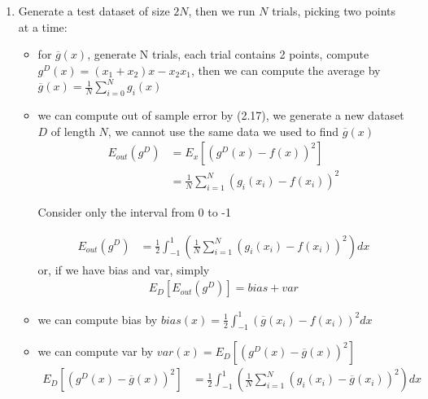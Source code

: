 \documentclass{article}
\begin{document}
\begin{enumerate}
\begin{enumerate}[label=(\alph*)]
            \item Generate a test dataset of size $2N$, then we run $N$ trials, picking two points at a time:
            \begin{itemize}
                \item for $\overline{g}(x)$, generate N trials, each trial contains 2 points, compute $g^D(x) = (x_1 + x_2)x - x_2x_1$, then we can compute the average by $\overline{g}(x) = \frac{1}{N}\sum_{i = 0}^{N}g_i(x)$
                \item we can compute out of sample error by (2.17), we generate a new dataset $D$ of length $N$, we cannot use the same data we used to find $\overline{g}(x)$
                \begin{align*}
                    E_{out}(g^D) &= E_x[(g^D(x) - f(x))^2]\\
                    &= \frac{1}{N}\sum_{i = 1}^{N}(g_i(x_i) - f(x_i))^2
                \end{align*}
                \begin{center}
                    Consider only the interval from 0 to -1
                \end{center}
                \begin{align*}
                    E_{out}(g^D) &= \frac{1}{2}\int_{-1}^{1}(\frac{1}{N}\sum_{i=1}^{N}(g_i(x_i) - f(x_i))^2)dx
                \end{align*}
                or, if we have bias and var, simply
                \begin{align*}
                    E_D[E_{out}(g^D)] = bias + var
                \end{align*}
                \item we can compute bias by $bias(x) = \frac{1}{2}\int_{-1}^{1}(\overline{g}(x_i) - f(x_i))^2dx$
                \item we can compute var by $var(x) = E_D[(g^D(x) - \overline{g}(x))^2]$
                \begin{align*}
                    E_D[(g^D(x) - \overline{g}(x))^2] &= \frac{1}{2}\int_{-1}^{1}(\frac{1}{N}\sum_{i = 1}^{N}(g_i(x_i) - \overline{g}(x_i))^2)dx
                \end{align*}
            \end{itemize}


\end{enumerate}
\end{enumerate}
\end{document}
